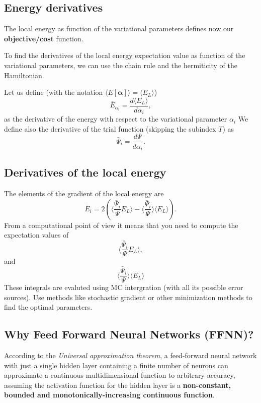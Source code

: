 \documentclass[%
oneside,                 %
final,                   %
10pt]{article}
\begin{document}
\subsection{Energy derivatives}
\begin{block}{}
The local energy as function of the variational parameters defines now our \textbf{objective/cost} function.

To find the derivatives of the local energy expectation value as function of the variational parameters, we can use the chain rule and the hermiticity of the Hamiltonian.  

Let us define (with the notation $\langle E[\bm{\alpha}]\rangle =\langle  E_L\rangle$)
\[
\bar{E}_{\alpha_i}=\frac{d\langle  E_L\rangle}{d\alpha_i},
\]
as the derivative of the energy with respect to the variational parameter $\alpha_i$
We define also the derivative of the trial function (skipping the subindex $T$) as 
\[
\bar{\Psi}_{i}=\frac{d\Psi}{d\alpha_i}.
\]
\end{block}

\subsection{Derivatives of the local energy}
\begin{block}{}
The elements of the gradient of the local energy are 
\[
\bar{E}_{i}= 2\left( \langle \frac{\bar{\Psi}_{i}}{\Psi}E_L\rangle -\langle \frac{\bar{\Psi}_{i}}{\Psi}\rangle\langle E_L \rangle\right).
\]
From a computational point of view it means that you need to compute the expectation values of 
\[
\langle \frac{\bar{\Psi}_{i}}{\Psi}E_L\rangle,
\]
and
\[
\langle \frac{\bar{\Psi}_{i}}{\Psi}\rangle\langle E_L\rangle
\]
These integrals are evaluted using MC intergration (with all its possible error sources). Use methods like stochastic gradient or other minimization methods to find the optimal parameters.
\end{block}

\subsection{Why Feed Forward Neural Networks (FFNN)?}

According to the \emph{Universal approximation theorem}, a feed-forward
neural network with just a single hidden layer containing a finite
number of neurons can approximate a continuous multidimensional
function to arbitrary accuracy, assuming the activation function for
the hidden layer is a \textbf{non-constant, bounded and
monotonically-increasing continuous function}.
\end{document}
